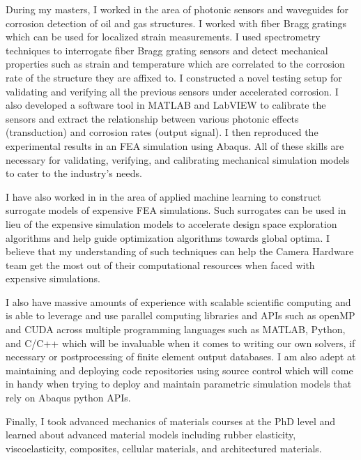 \documentclass[12pt]{article} %
\begin{document}
\medskip %

During my masters, I worked in the area of photonic sensors and waveguides for corrosion detection of oil and gas structures. I worked with fiber Bragg gratings which can be used for localized strain measurements. I used spectrometry techniques to interrogate fiber Bragg grating sensors and detect mechanical properties such as strain and temperature which are correlated to the corrosion rate of the structure they are affixed to. I constructed a novel testing setup for validating and verifying all the previous sensors under accelerated corrosion. I also developed a software tool in MATLAB and LabVIEW to calibrate the sensors and extract the relationship between various photonic effects (transduction) and corrosion rates (output signal). I then reproduced the experimental results in an FEA simulation using Abaqus. All of these skills are necessary for validating, verifying, and calibrating mechanical simulation models to cater to the industry's needs.

\medskip %

I have also worked in in the area of applied machine learning to construct surrogate models of expensive FEA simulations. Such surrogates can be used in lieu of the expensive simulation models to accelerate design space exploration algorithms and help guide optimization algorithms towards global optima. I believe that my understanding of such techniques can help the Camera Hardware team get the most out of their computational resources when faced with expensive simulations.

\medskip %

I also have massive amounts of experience with scalable scientific computing and is able to leverage and use parallel computing libraries and APIs such as openMP and CUDA across multiple programming languages such as MATLAB, Python, and C/C++ which will be invaluable when it comes to writing our own solvers, if necessary or postprocessing of finite element output databases. I am also adept at maintaining and deploying code repositories using source control which will come in handy when trying to deploy and maintain parametric simulation models that rely on Abaqus python APIs.

\medskip %

Finally, I took advanced mechanics of materials courses at the PhD level and learned about advanced material models including rubber elasticity, viscoelasticity, composites, cellular materials, and architectured materials.
\end{document}
